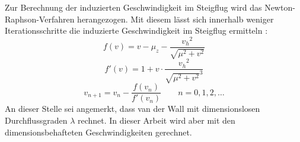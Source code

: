 Zur Berechnung der induzierten Geschwindigkeit im Steigflug wird das Newton-Raphson-Verfahren herangezogen. Mit diesem lässt sich innerhalb weniger Iterationsschritte die induzierte Geschwindigkeit im Steigflug ermitteln \cite[S.153]{Wall.2015}:
\begin{equation}
	f(v) = v-\mu_z-\frac{{v_h}^2}{\sqrt{\mu^2+v^2}}
\end{equation}
\begin{equation}
	f'(v) = 1 + v\cdot\frac{{v_h}^2}{\sqrt{\mu^2+v^2}^3}
\end{equation}
\begin{equation}
	v_{n+1} = v_n - \frac{f(v_n)}{f'(v_n)}\qquad n = 0,1,2,\dots
\end{equation}
An dieser Stelle sei angemerkt, dass van der Wall mit dimensionslosen Durchflussgraden \ensuremath{\lambda} rechnet. In dieser Arbeit wird aber mit den dimensionsbehafteten Geschwindigkeiten gerechnet.




